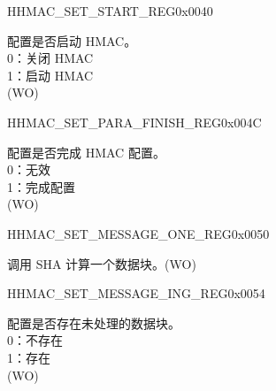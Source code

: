 \begin{register}{H}{HMAC\_SET\_START\_REG}{0x0040}\label{regdesc:HMACSETSTARTREG}
%
%
\regnewline%
\begin{regdesc}\begin{reglist}
\label{fielddesc:HMACSETSTART}\item [HMAC\_SET\_START] 配置是否启动 HMAC。
\\0：关闭 HMAC
\\1：启动 HMAC
\\(WO)
\end{reglist}\end{regdesc}
\end{register}


\begin{register}{H}{HMAC\_SET\_PARA\_FINISH\_REG}{0x004C}\label{regdesc:HMACSETPARAFINISHREG}
%
%
\regnewline%
\begin{regdesc}\begin{reglist}
\label{fielddesc:HMACSETPARAEND}\item [HMAC\_SET\_PARA\_END] 配置是否完成 HMAC 配置。
\\0：无效
\\1：完成配置
\\(WO)
\end{reglist}\end{regdesc}
\end{register}


\begin{register}{H}{HMAC\_SET\_MESSAGE\_ONE\_REG}{0x0050}\label{regdesc:HMACSETMESSAGEONEREG}
%
%
\regnewline%
\begin{regdesc}\begin{reglist}
\label{fielddesc:HMACSETTEXTONE}\item [HMAC\_SET\_TEXT\_ONE] 调用 SHA 计算一个数据块。(WO)
\end{reglist}\end{regdesc}
\end{register}


\begin{register}{H}{HMAC\_SET\_MESSAGE\_ING\_REG}{0x0054}\label{regdesc:HMACSETMESSAGEINGREG}
%
%
\regnewline%
\begin{regdesc}\begin{reglist}
\label{fielddesc:HMACSETTEXTING}\item [HMAC\_SET\_TEXT\_ING] 配置是否存在未处理的数据块。
\\0：不存在
\\1：存在
\\(WO)
\end{reglist}\end{regdesc}
\end{register}


